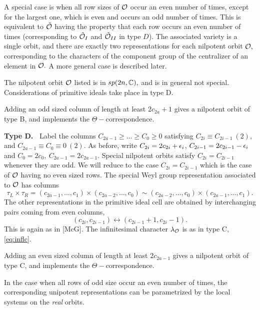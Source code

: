 \documentclass[11pt ,reqno]{amsart}
\begin{document}
{\begin{example*}
A special case is when all row sizes of $\mathcal O$ occur an even number of
times, except for the largest 
one, which is even and occurs an odd number of times. This is
equivalent to  ${\check {\mathcal O}}$ having the property that each row occurs an even
number of times (corresponding to ${\check {\mathcal O}}_I$ and ${\check {\mathcal O}}_{II}$ in type
$D$). The associated variety is a single orbit, and there are exactly two
representations for each nilpotent orbit $\mathcal O,$ corresponding to the
characters of the component group of the centralizer of an element in
$\mathcal O.$ A more general case  is described later.
\end{example*}
\begin{remark*}
The nilpotent orbit $\mathcal O$ listed is in $sp(2n,{\mathbb C}),$   and is in
general not special. Considerations of primitive ideals take place in
type D.

Adding an odd sized column of length at least  $2c_{2a}+1$ gives a
nilpotent orbit of type B, and implements the $\Theta-$correspondence. 
\end{remark*}

}


\medskip
\noindent\textbf{Type D.\ } Label the columns $C_{2a-1}\ge\dots \ge
C_0\ge 0$ satisfying $C_{2i}\equiv C_{2i-1}\ (2),$ and $C_{2a-1}\equiv
C_0\equiv 0\ (2).$ As before, write
$C_{2i}=2c_{2i}+{\epsilon}_i$, $C_{2i-1}=2c_{2i-1}-{\epsilon}_i$ and $C_0=2c_0,\
C_{2a-1}=2c_{2a-1}.$  Special nilpotent orbits satisfy
$C_{2i}=C_{2i-1}$ whenever  they are odd. We will reduce to the case
$C_{2i}=C_{2i-1}$ which is the case of $\mathcal O$ having no even
sized rows.
The special Weyl group representation associated to ${\mathcal O}$ has columns
\begin{equation}
  \label{eq:drep}
\tau_L\times\tau_R=(c_{2a-1},\dots ,c_1)\times (c_{2a-2},\dots
,c_0)\sim
(c_{2a-2},\dots
,c_0)\times (c_{2a-1},\dots ,c_1).  
\end{equation}
The other representations in the primitive ideal cell are obtained by
interchanging pairs coming from even columns, 
$$
(c_{2i},c_{2i-1})\longleftrightarrow (c_{2i-1}+1,c_{2i}-1).
$$
This is again as in  [McG].  
The infinitesimal character ${\lambda}_{{\mathcal O}}$ is as in type C, \eqref{eq:inflc}.
\begin{remark*}
Adding an even sized column of length at least $2c_{2a-1}$ gives a
nilpotent orbit of type C, and implements the $\Theta-$correspondence. 

In the case when all rows of odd size occur an even number of times,
the corresponding unipotent representations can be parametrized by the
local systems on the \textit{real} orbits.

\end{remark*}
\end{document}

